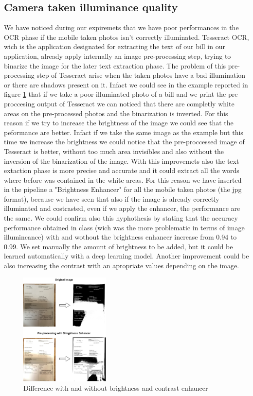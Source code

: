 \documentclass[10pt,twocolumn,letterpaper]{article}
\begin{document}
\subsection{Camera taken illuminance quality}
We have noticed during our expiremets that we have poor performances in the OCR phase if the mobile taken photos isn't correctly illuminated. Tesseract OCR, wich is the application designated for extracting the text of our bill in our application, already apply internally an image pre-processing step, trying to binarize the image for the later text extraction phase. The problem of this pre-processing step of Tesseract arise when the taken photos have a bad illumination or there are shadows present on it. Infact we could see in the example reported in figure \ref{bright-constrast-experiment} that if we take a poor illuminated photo of a bill and we print the pre-proccesing output of Tesseract we can noticed that there are completly white areas on the pre-processed photos and the binarization is inverted. For this reason if we try to increase the brightness of the image we could see that the peformance are better. Infact if we take the same image as the example but this time we increase the brightness we could notice that the pre-proccessed image of Tesseract is better, without too much area invisibles and also without the inversion of the binarization of the image. With this improvemets also the text extaction phase is more precise and accurate and it could extract all the words where before was contained in the white areas. For this reason we have inserted in the pipeline a "Brightness Enhancer" for all the mobile taken photos (the jpg format), because we have seen that also if the image is already correctly illuminated and costrasted, even if we apply the enhancer, the performance are the same. We could confirm also this hyphothesis by stating that the accuracy performance obtained in class (wich was the more problematic in terms of image illumincance) with and wothout the brightness enhancer increase from 0.94 to 0.99. We set manually the amount of brightness to be added, but it could be learned automatically with a deep learning model. Another improvement could be also increasing the contrast with an apropriate values depending on the image.

\begin{figure}[h]
	\centering
	\includegraphics[width=0.4\textwidth]{images/bright-contrast-experiment.png}
	\caption{Difference with and without brightness and contrast enhancer}
	\label{bright-constrast-experiment}
\end{figure}
\end{document}
